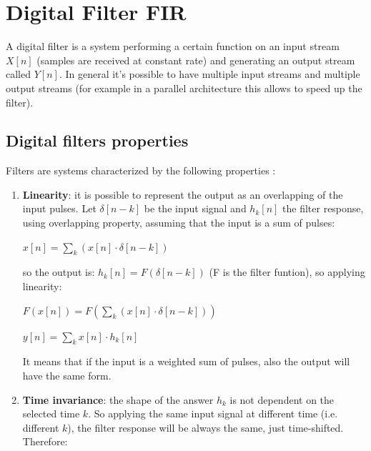 \chapter{Digital Filter FIR}
A digital filter is a system performing a certain function on an input stream $ X[n] $ (samples are received at constant rate) and generating an output stream called $ Y[n] $. 
In general it's possible to have multiple input streams and multiple output streams (for example in a parallel architecture this allows to speed up the filter).
\section{Digital filters properties}
Filters are systems characterized by the following properties \cite{fir1}:
\begin{enumerate}
	\item \textbf{Linearity}: it is possible to represent the output as an overlapping of the input pulses. Let $\delta[n-k]$ be the input signal and $ h_{k}[n] $ the filter response, using overlapping property, assuming that the input is a sum of pulses: 
	\begin{center}
		$ x[n]=\sum\limits_{k}^{} (x[n]\cdot \delta[n-k]) $
		\end{center}
		so the output is: $ h_{k}[n] =F(\delta[n-k])$ (F is the filter funtion), so applying linearity: 
			\begin{center}
				$ F(x[n])=F(\sum\limits_{k}^{ } (x[n]\cdot \delta[n-k])) $\\
			\end{center}
			\begin{center}
				$ y[n]=\sum\limits_{k}^{ } x[n]\cdot h_{k}[n] $
			\end{center}
    It means that if the input is a weighted sum of pulses, also the output will have the same form.
    \item  \textbf{Time invariance}: the shape of the answer $ h_{k} $ is not dependent on the selected time $ k $. So applying the same input signal at different time (i.e. different $ k $), the filter response will be always the same, just time-shifted. Therefore:
    

\end{enumerate}
